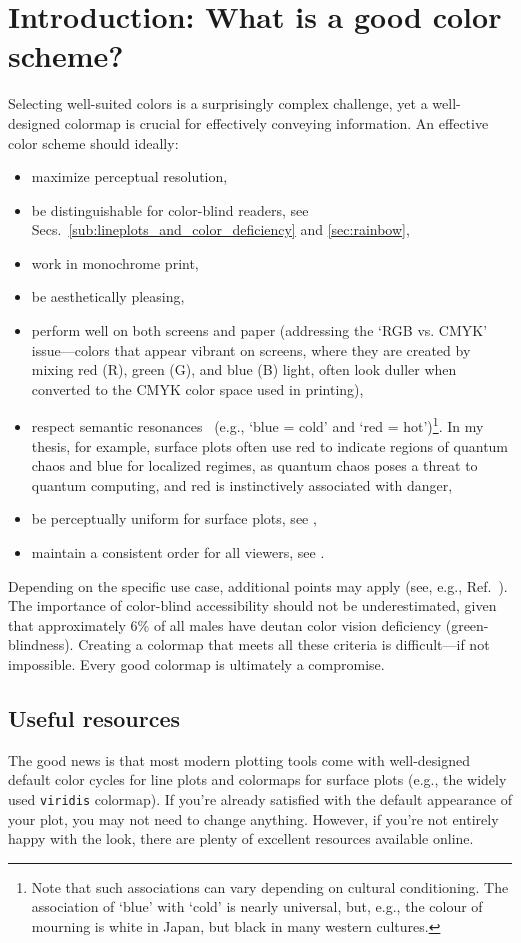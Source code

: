 \section{Introduction: What is a good color scheme?}
Selecting well-suited colors is a surprisingly complex challenge, yet a well-designed colormap is crucial for effectively conveying information. An effective color scheme should ideally:
\begin{itemize}
	\item maximize perceptual resolution,
    \item be distinguishable for color-blind readers, see Secs.~\ref{sub:lineplots_and_color_deficiency} and \ref{sec:rainbow},
    \item work in monochrome print,
    \item be aesthetically pleasing,
    \item perform well on both screens and paper (addressing the `RGB vs. CMYK' issue---colors that appear vibrant on screens, where they are created by mixing red (R), green (G), and blue (B) light, often look duller when converted to the CMYK color space used in printing),
    \item respect semantic resonances~\cite{linSelectingSemanticallyResonantColors2013} (e.g., `blue = cold' and `red = hot')\footnote{Note that such associations can vary depending on cultural conditioning. The association of `blue' with `cold' is nearly universal, but, e.g., the colour of mourning is white in Japan, but black in many western cultures.}. In my thesis, for example, surface plots often use red to indicate regions of quantum chaos and blue for localized regimes, as quantum chaos poses a threat to quantum computing, and red is instinctively associated with danger,
    \item be perceptually uniform for surface plots, see ,
    \item maintain a consistent order for all viewers, see .
\end{itemize}

Depending on the specific use case, additional points may apply (see, e.g., Ref.~\cite{moreland2009}). The importance of color-blind accessibility should not be underestimated, given that approximately 6\% of all males have deutan color vision deficiency (green-blindness).
Creating a colormap that meets all these criteria is difficult---if not impossible. Every good colormap is ultimately a compromise.

\subsection{Useful resources}
The good news is that most modern plotting tools come with well-designed default color cycles for line plots and colormaps for surface plots (e.g., the widely used \verb|viridis| colormap). If you're already satisfied with the default appearance of your plot, you may not need to change anything. However, if you're not entirely happy with the look, there are plenty of excellent resources available online.

